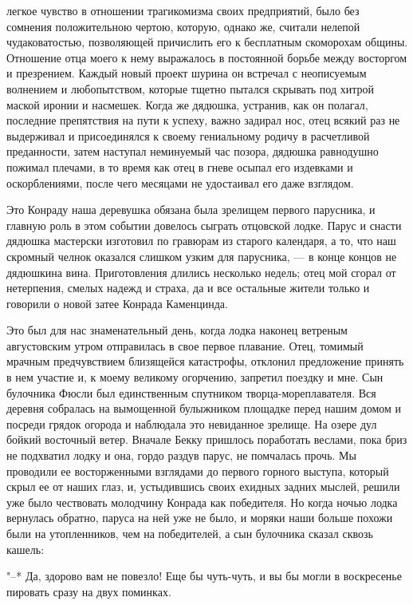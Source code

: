 легкое чувство  в отношении  трагикомизма своих предприятий,  было без
сомнения  положительною чертою,  которую, однако  же, считали  нелепой
чудаковатостью,  позволяющей причислить  его  к бесплатным  скоморохам
общины. Отношение  отца моего  к нему  выражалось в  постоянной борьбе
между восторгом и презрением. Каждый новый проект шурина он встречал с
неописуемым волнением и любопытством,  которые тщетно пытался скрывать
под хитрой маской  иронии и насмешек. Когда же  дядюшка, устранив, как
он полагал, последние препятствия на пути к успеху, важно задирал нос,
отец всякий  раз не  выдерживал и  присоединялся к  своему гениальному
родичу  в  расчетливой  преданности,  затем  наступал  неминуемый  час
позора,  дядюшка равнодушно  пожимал плечами,  в то  время как  отец в
гневе осыпал  его издевками  и оскорблениями,  после чего  месяцами не
удостаивал его даже взглядом.

Это Конраду наша деревушка обязана  была зрелищем первого парусника, и
главную роль в этом событии  довелось сыграть отцовской лодке. Парус и
снасти дядюшка мастерски изготовил по гравюрам из старого календаря, а
то, что наш скромный челнок  оказался слишком узким для парусника, ---
в  конце концов  не  дядюшкина вина.  Приготовления длились  несколько
недель;  отец мой  сгорал от  нетерпения, смелых  надежд и  страха, да
и  все  остальные жители  только  и  говорили  о новой  затее  Конрада
Каменцинда.

Это  был для  нас знаменательный  день, когда  лодка наконец  ветреным
августовским утром  отправилась в свое первое  плавание. Отец, томимый
мрачным  предчувствием  близящейся  катастрофы,  отклонил  предложение
принять  в  нем  участие  и,  к  моему  великому  огорчению,  запретил
поездку  и  мне.  Сын   булочника  Фюсли  был  единственным  спутником
творца-мореплавателя. Вся  деревня собралась на  вымощенной булыжником
площадке перед  нашим домом и  посреди грядок огорода и  наблюдала это
невиданное зрелище. На озере дул бойкий восточный ветер. Вначале Бекку
пришлось поработать веслами, пока бриз не подхватил лодку и она, гордо
раздув  парус,  не  помчалась  прочь. Мы  проводили  ее  восторженными
взглядами до первого горного выступа,  который скрыл ее от наших глаз,
и, устыдившись своих ехидных задних мыслей, решили уже было чествовать
молодчину  Конрада  как победителя.  Но  когда  ночью лодка  вернулась
обратно, паруса на  ней уже не было, и моряки  наши больше похожи были
на утопленников,  чем на  победителей, а  сын булочника  сказал сквозь
кашель:

"--* Да,  здорово вам не  повезло! Еще бы чуть-чуть,  и вы бы  могли в
воскресенье пировать сразу на двух поминках.

